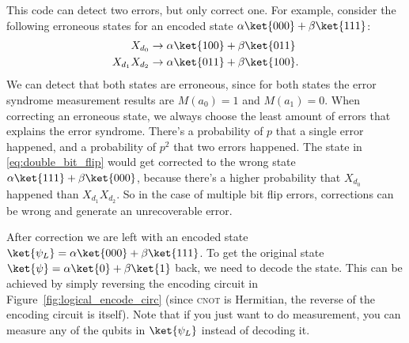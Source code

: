 This code can detect two errors, but only correct one. For example, consider the following erroneous states for an encoded state $\alpha\ket{000} + \beta\ket{111}$:
\begin{align}
  X_{d_0} &\rightarrow \alpha\ket{100} + \beta\ket{011} \label{eq:single_bit_flip} \\
  X_{d_1}X_{d_2} &\rightarrow \alpha\ket{011} + \beta\ket{100}. \label{eq:double_bit_flip}
\end{align}
We can detect that both states are erroneous, since for both states the error syndrome measurement results are $M(a_0) = 1$ and $M(a_1) = 0$. When correcting an erroneous state, we always choose the least amount of errors that explains the error syndrome. There's a probability of $p$ that a single error happened, and a probability of $p^2$ that two errors happened. The state in \ref{eq:double_bit_flip} would get corrected to the wrong state $\alpha\ket{111} + \beta\ket{000}$, because there's a higher probability that $X_{d_0}$ happened than $X_{d_1}X_{d_2}$. So in the case of multiple bit flip errors, corrections can be wrong and generate an unrecoverable error.

After correction we are left with an encoded state $\ket{\psi_L} = \alpha\ket{000} + \beta\ket{111}$. To get the original state $\ket{\psi} = \alpha\ket{0} + \beta\ket{1}$ back, we need to decode the state. This can be achieved by simply reversing the encoding circuit in Figure~\ref{fig:logical_encode_circ} (since \textsc{cnot} is Hermitian, the reverse of the encoding circuit is itself). Note that if you just want to do measurement, you can measure any of the qubits in $\ket{\psi_L}$ instead of decoding it.

